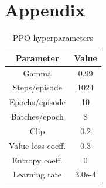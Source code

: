 \documentclass[conference]{IEEEtran}
\begin{document}
\section*{Appendix}


\begin{table}[h]
\caption{PPO hyperparameters}
\begin{center}
\label{hyperparams_transposed}
\begin{tabular}{c | c}
Parameter & Value \\
\hline
Gamma & 0.99 \\
Steps/episode & 1024 \\
Epochs/episode & 10 \\
Batches/epoch & 8 \\
Clip & 0.2 \\
Value loss coeff. & 0.3 \\
Entropy coeff. & 0 \\
Learning rate & 3.0e-4 \\
\end{tabular}
\end{center}
\end{table}
\end{document}
